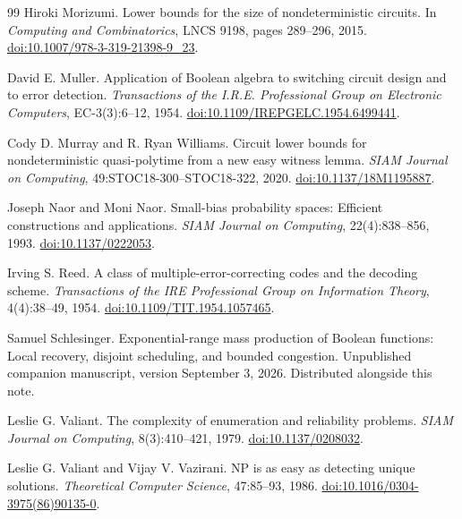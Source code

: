 \documentclass[11pt]{article}
\theoremstyle{definition}
\theoremstyle{remark}
\begin{document}
\begin{thebibliography}{99}
Hiroki Morizumi.
\newblock Lower bounds for the size of nondeterministic circuits.
\newblock In \emph{Computing and Combinatorics}, LNCS 9198, pages 289--296,
2015.
\newblock \href{https://doi.org/10.1007/978-3-319-21398-9_23}{doi:10.1007/978-3-319-21398-9\_23}.

David E. Muller.
\newblock Application of Boolean algebra to switching circuit design and to
error detection.
\newblock \emph{Transactions of the I.R.E. Professional Group on Electronic
Computers}, EC-3(3):6--12, 1954.
\newblock \href{https://doi.org/10.1109/IREPGELC.1954.6499441}{doi:10.1109/IREPGELC.1954.6499441}.

Cody D. Murray and R. Ryan Williams.
\newblock Circuit lower bounds for nondeterministic quasi-polytime from a new
easy witness lemma.
\newblock \emph{SIAM Journal on Computing}, 49:STOC18-300--STOC18-322, 2020.
\newblock \href{https://doi.org/10.1137/18M1195887}{doi:10.1137/18M1195887}.

Joseph Naor and Moni Naor.
\newblock Small-bias probability spaces: Efficient constructions and
applications.
\newblock \emph{SIAM Journal on Computing}, 22(4):838--856, 1993.
\newblock \href{https://doi.org/10.1137/0222053}{doi:10.1137/0222053}.

Irving S. Reed.
\newblock A class of multiple-error-correcting codes and the decoding scheme.
\newblock \emph{Transactions of the IRE Professional Group on Information
Theory}, 4(4):38--49, 1954.
\newblock \href{https://doi.org/10.1109/TIT.1954.1057465}{doi:10.1109/TIT.1954.1057465}.

Samuel Schlesinger.
\newblock Exponential-range mass production of Boolean functions: Local
recovery, disjoint scheduling, and bounded congestion.
\newblock Unpublished companion manuscript, version September 3, 2026.
Distributed alongside this note.

Leslie G. Valiant.
\newblock The complexity of enumeration and reliability problems.
\newblock \emph{SIAM Journal on Computing}, 8(3):410--421, 1979.
\newblock \href{https://doi.org/10.1137/0208032}{doi:10.1137/0208032}.

Leslie G. Valiant and Vijay V. Vazirani.
\newblock NP is as easy as detecting unique solutions.
\newblock \emph{Theoretical Computer Science}, 47:85--93, 1986.
\newblock \href{https://doi.org/10.1016/0304-3975(86)90135-0}{doi:10.1016/0304-3975(86)90135-0}.

\end{thebibliography}
\end{document}
